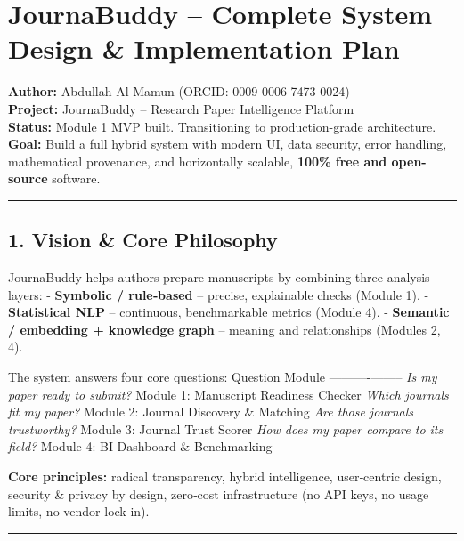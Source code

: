 \documentclass[
]{article}
\author{}
\date{}
\begin{document}
\section{JournaBuddy -- Complete System Design \& Implementation
Plan}\label{journabuddy-complete-system-design-implementation-plan}

\textbf{Author:} Abdullah Al Mamun (ORCID: 0009-0006-7473-0024)\\
\textbf{Project:} JournaBuddy -- Research Paper Intelligence Platform\\
\textbf{Status:} Module 1 MVP built. Transitioning to production-grade
architecture.\\
\textbf{Goal:} Build a full hybrid system with modern UI, data security,
error handling, mathematical provenance, and horizontally scalable,
\textbf{100\% free and open-source} software.

\begin{center}\rule{0.5\linewidth}{0.5pt}\end{center}

\subsection{1. Vision \& Core Philosophy}\label{vision-core-philosophy}

JournaBuddy helps authors prepare manuscripts by combining three
analysis layers: - \textbf{Symbolic / rule‑based} -- precise,
explainable checks (Module 1). - \textbf{Statistical NLP} -- continuous,
benchmarkable metrics (Module 4). - \textbf{Semantic / embedding +
knowledge graph} -- meaning and relationships (Modules 2, 4).

The system answers four core questions: \textbar{} Question \textbar{}
Module \textbar{} \textbar----------\textbar--------\textbar{}
\textbar{} \emph{Is my paper ready to submit?} \textbar{} Module 1:
Manuscript Readiness Checker \textbar{} \textbar{} \emph{Which journals
fit my paper?} \textbar{} Module 2: Journal Discovery \& Matching
\textbar{} \textbar{} \emph{Are those journals trustworthy?} \textbar{}
Module 3: Journal Trust Scorer \textbar{} \textbar{} \emph{How does my
paper compare to its field?} \textbar{} Module 4: BI Dashboard \&
Benchmarking \textbar{}

\textbf{Core principles:} radical transparency, hybrid intelligence,
user‑centric design, security \& privacy by design, zero‑cost
infrastructure (no API keys, no usage limits, no vendor lock-in).

\begin{center}\rule{0.5\linewidth}{0.5pt}\end{center}
\end{document}
